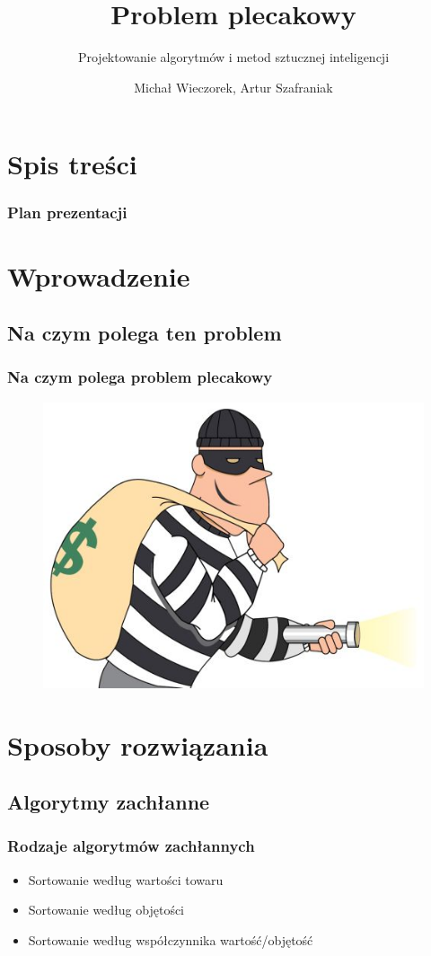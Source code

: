 \documentclass{beamer}
\title{Problem plecakowy}
\subtitle{Projektowanie algorytmów i metod sztucznej inteligencji}
\author{Michał Wieczorek, Artur Szafraniak}
\institute{
Automatyka i Robotyka,
Wydział Elektroniki\\
Politechnika Wrocławska}
\begin{document}
\begin{frame}
\titlepage
\end{frame}

\section{Spis treści}
\begin{frame}
	\frametitle{Plan prezentacji}
	\tableofcontents
\end{frame}

\section{Wprowadzenie}
\subsection{Na czym polega ten problem}
\begin{frame}
	\frametitle{Na czym polega problem plecakowy}
	\begin{figure}[H]
	\centering
	\includegraphics[scale=0.3]{zlodziej2.png}
	\end{figure}
\end{frame}

\section{Sposoby rozwiązania}
\subsection{Algorytmy zachłanne}
\begin{frame}
	\frametitle{Rodzaje algorytmów zachłannych}
	\begin{itemize}
	\item Sortowanie według wartości towaru
	\item Sortowanie według objętości
	\item Sortowanie według współczynnika wartość/objętość
	\end{itemize}
\end{frame}
\end{document}
